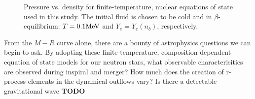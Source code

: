 \begin{figure}
	\centering
	
	\caption[Pressure vs. density for a cold, beta-equilibrium slice]{
		Pressure vs. density for finite-temperature, nuclear equations of state used in this study. The initial fluid is chosen to be cold and in $\beta$-equilibrium: $T=0.1 {\rm MeV}$ and $Y_e = Y_e (n_b)$, respectively.
	}
	\label{fig:PvsRho}
\end{figure}

From the $M-R$ curve alone, there are a bounty of astrophysics questions we can begin to ask.  By adopting these finite-temperature, composition-dependent equation of state models for our neutron stars, what observable characterisitics are observed during inspiral and merger?  How much does the creation of r-process elements in the dynamical outflows vary?  Is there a detectable gravitational wave \textbf{TODO}
